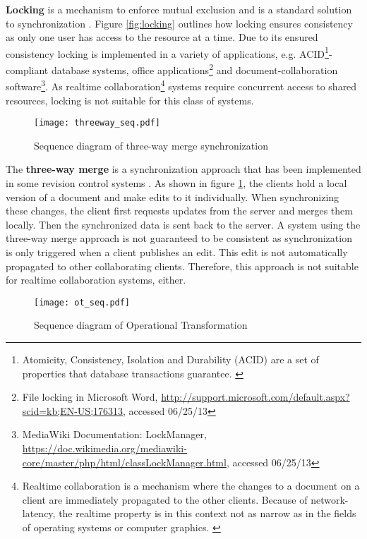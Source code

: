 \textbf{Locking} is a mechanism to enforce mutual exclusion and is a standard solution to synchronization \cite{Dijkstra_1965}. Figure \ref{fig:locking} outlines how locking ensures consistency as only one user has access to the resource at a time. Due to its ensured consistency locking is implemented in a variety of applications, e.g. ACID\footnote{Atomicity, Consistency, Isolation and Durability (ACID) are a set of properties that database transactions guarantee. \cite{Gray_1981}}-compliant database systems, office applications\footnote{File locking in Microsoft Word, \url{http://support.microsoft.com/default.aspx?scid=kb;EN-US;176313}, accessed 06/25/13} and document-collaboration software\footnote{MediaWiki Documentation: LockManager, \url{https://doc.wikimedia.org/mediawiki-core/master/php/html/classLockManager.html}, accessed 06/25/13}. As realtime collaboration\footnote{Realtime collaboration is a mechanism where the changes to a document on a client are immediately propagated to the other clients. Because of network-latency, the realtime property is in this context not as narrow as in the fields of operating systems or computer graphics. \cite{Sun_2002}} systems require concurrent access to shared resources, locking is not suitable for this class of systems.

\begin{figure}[!h]
\begin{center}
\texttt{[image: threeway\_seq.pdf]}
\caption{Sequence diagram of three-way merge synchronization}
\label{fig:threeway}
\end{center}
\end{figure}

The \textbf{three-way merge} is a synchronization approach that has been implemented in some revision control systems \cite{Pilato_2008}. As shown in figure \ref{fig:threeway}, the clients hold a local version of a document and make edits to it individually. When synchronizing these changes, the client first requests updates from the server and merges them locally. Then the synchronized data is sent back to the server. A system using the three-way merge approach is not guaranteed to be consistent as synchronization is only triggered when a client publishes an edit. This edit is not automatically propagated to other collaborating clients. Therefore, this approach is not suitable for realtime collaboration systems, either.

\begin{figure}[!h]
\begin{center}
\texttt{[image: ot\_seq.pdf]}
\caption{Sequence diagram of Operational Transformation}

\label{fig:optr}
\end{center}
\end{figure}

